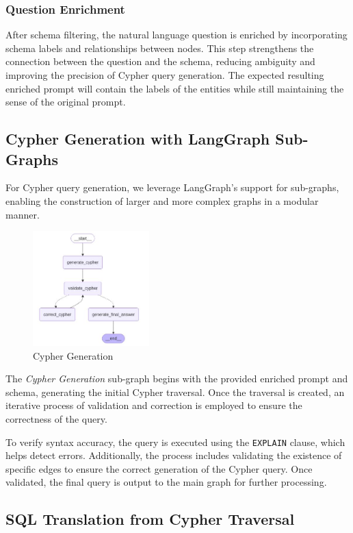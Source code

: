 \subsubsection{Question Enrichment}  
After schema filtering, the natural language question is enriched by incorporating schema labels and relationships between nodes. This step strengthens the connection between the question and the schema, reducing ambiguity and improving the precision of Cypher query generation. The expected resulting enriched prompt will contain the labels of the entities while still maintaining the sense of the original prompt.

\subsection{Cypher Generation with LangGraph Sub-Graphs}
For Cypher query generation, we leverage LangGraph's support for sub-graphs, enabling the construction of larger and more complex graphs in a modular manner. 
\begin{figure}[h]
    \centering
\includegraphics[width=0.4\textwidth]{IMAGES/LangGraph 2.JPG}
    \caption{Cypher Generation}
    \label{fig:Matching Nodes}
\end{figure}

The \textit{Cypher Generation} sub-graph begins with the provided enriched prompt and schema, generating the initial Cypher traversal. Once the traversal is created, an iterative process of validation and correction is employed to ensure the correctness of the query. 

To verify syntax accuracy, the query is executed using the \texttt{EXPLAIN} clause, which helps detect errors. Additionally, the process includes validating the existence of specific edges to ensure the correct generation of the Cypher query. Once validated, the final query is output to the main graph for further processing.


\subsection{SQL Translation from Cypher Traversal}

